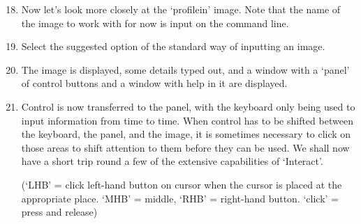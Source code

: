 {\small
\begin{enumerate}
\setcounter{enumi}{17}

\item Now let's look more closely at the `profile{\undersc}in' image.
      Note that the name of the image to work with for now is
      input on the command line.

\item Select the suggested option of the standard way of inputting an
      image.

\item The image is displayed, some details typed out, and a window with
      a `panel' of control buttons and a window with help in it are
      displayed.

\item Control is now transferred to the panel, with the keyboard only
      being used to input information from time to time. When control has
      to be shifted between the keyboard, the panel, and the image, it is
      sometimes necessary to click on those areas to shift attention to
      them before they can be used. We shall now have a short trip round
      a few of the extensive capabilities of `Interact'.

      (`LHB' = click left-hand button on cursor when the
        cursor is placed at the  appropriate place. `MHB' = middle, `RHB'
        = right-hand button. `click' = press and release)


\end{enumerate}}
